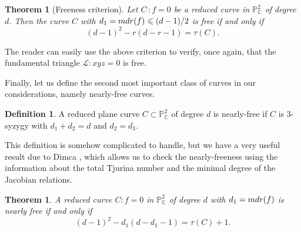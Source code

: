 \documentclass[12pt]{article}
\theoremstyle{plain}
\newtheorem{theorem}[thm]{Theorem}
\theoremstyle{definition}
\newtheorem{definition}[thm]{Definition}
\renewcommand\leq{\leqslant}
\begin{document}
\begin{theorem}[Freeness criterion]
\label{dp}
Let $C \, : f=0$ be a reduced curve in $\mathbb{P}^{2}_{\mathbb{C}}$ of degree $d$. Then the curve $C$ with $d_{1}={\rm mdr}(f)\leq (d-1)/2$ is free if and only if
\begin{equation}
\label{duPles}
(d-1)^{2} - r(d-r-1) = \tau(C).
\end{equation}
\end{theorem}
 The reader can easily use the above criterion to verify, once again, that the fundamental triangle $\mathcal{L} : xyz=0$ is free.


Finally, let us define the second most important class of curves in our considerations, namely nearly-free curves.
\begin{definition}
A reduced plane curve $C \subset \mathbb{P}^{2}_{\mathbb{C}}$ of degree $d$ is nearly-free if $C$ is $3$-syzygy with $d_{1}+d_{2}=d$ and $d_{2}=d_{3}$.
\end{definition}
This definition is somehow complicated to handle, but we have a very useful result due to Dimca \cite{Dimca1}, which allows us to check the nearly-freeness using the information about the total Tjurina number and the minimal degree of the Jacobian relations.
\begin{theorem}
A reduced curve $C : f=0$ in $\mathbb{P}^{2}_{\mathbb{C}}$ of degree $d$ with $d_{1} = {\rm mdr}(f)$ is nearly free if and only if
\begin{equation}
(d-1)^{2}-d_{1}(d-d_{1}-1)=\tau(C)+1.
\end{equation}   
\end{theorem}
\end{document}
